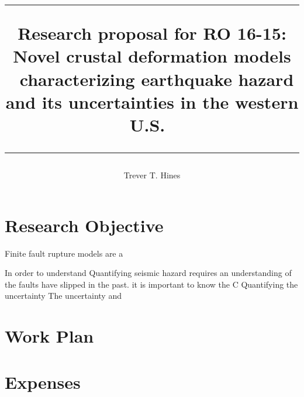 \documentclass[12pt]{article}
\title{	
 \rule{\headwidth}{1.0pt}
 Research proposal for RO 16-15:
 Novel crustal deformation models \
 characterizing earthquake hazard and its uncertainties in the western U.S.\
 \rule{\headwidth}{1.0pt}
 \author{Trever T. Hines}}
\begin{document}
\maketitle

\section*{Research Objective}
Finite fault rupture models are a 

In order to understand Quantifying seismic hazard requires an understanding of the faults have slipped in the past.  it is important to know the 
C
Quantifying the uncertainty The uncertainty 
\citep{Hines2016} and \citet{Hines2016}
\section*{Work Plan}

\section*{Expenses}

%

\end{document}

